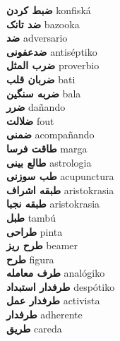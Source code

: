 \textbf{ ضبط کردن  } konfiská \\
\textbf{ ضد تانک  } bazooka \\
\textbf{ ضد  } adversario \\
\textbf{ ضدعفونی  } antiséptiko \\
\textbf{ ضرب المثل  } proverbio \\
\textbf{ ضربان قلب  } bati \\
\textbf{ ضربه سنگین  } bala \\
\textbf{ ضرر  } dañando \\
\textbf{ ضلالت  } fout \\
\textbf{ ضمنی  } acompañando \\
\textbf{ طاقت فرسا  } marga \\
\textbf{ طالع بینی  } astrologia \\
\textbf{ طب سوزنی  } acupunctura \\
\textbf{ طبقه اشراف  } aristokrasia \\
\textbf{ طبقه نجبا  } aristokrasia \\
\textbf{ طبل  } tambú \\
\textbf{ طراحی  } pinta \\
\textbf{ طرح ریز  } beamer \\
\textbf{ طرح  } figura \\
\textbf{ طرف معامله  } analógiko \\
\textbf{ طرفدار استبداد  } despótiko \\
\textbf{ طرفدار عمل  } activista \\
\textbf{ طرفدار  } adherente \\
\textbf{ طریق  } careda \\
